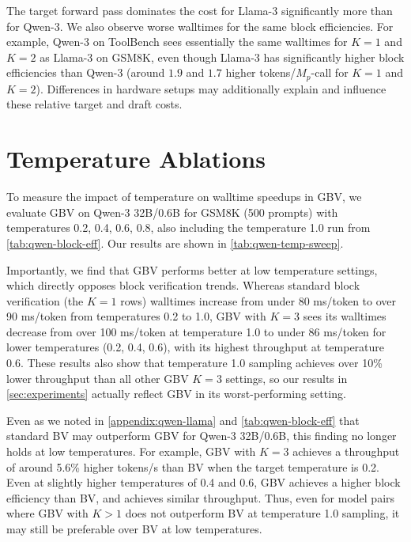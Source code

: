 \documentclass{article}
\theoremstyle{plain}
\theoremstyle{definition}
\theoremstyle{remark}
\begin{document}
The target forward pass dominates the cost for Llama-3 significantly more than for Qwen-3. We also observe worse walltimes for the same block efficiencies. For example, Qwen-3 on ToolBench sees essentially the same walltimes for $K=1$ and $K=2$ as Llama-3 on GSM8K, even though Llama-3 has significantly higher block efficiencies than Qwen-3 (around $1.9$ and $1.7$ higher tokens/$M_p$-call for $K=1$ and $K=2$). Differences in hardware setups may additionally explain and influence these relative target and draft costs.



\section{Temperature Ablations}
\label{appendix:temperature}

To measure the impact of temperature on walltime speedups in GBV, we evaluate GBV on Qwen-3 32B/0.6B for GSM8K (500 prompts) with temperatures 0.2, 0.4, 0.6, 0.8, also including the temperature 1.0 run from \cref{tab:qwen-block-eff}. Our results are shown in \cref{tab:qwen-temp-sweep}.

Importantly, we find that GBV performs better at low temperature settings, which directly opposes block verification trends. Whereas standard block verification (the $K=1$ rows) walltimes increase from under 80 ms/token to over 90 ms/token from temperatures 0.2 to 1.0, GBV with $K=3$ sees its walltimes decrease from over 100 ms/token at temperature 1.0 to under 86 ms/token for lower temperatures (0.2, 0.4, 0.6), with its highest throughput at temperature 0.6. These results also show that temperature 1.0 sampling achieves over 10\% lower throughput than all other GBV $K=3$ settings, so our results in \cref{sec:experiments} actually reflect GBV in its worst-performing setting.
 
Even as we noted in \cref{appendix:qwen-llama} and \cref{tab:qwen-block-eff} that standard BV may outperform GBV for Qwen-3 32B/0.6B, this finding no longer holds at low temperatures. For example, GBV with $K=3$ achieves a throughput of around 5.6\% higher tokens/s than BV when the target temperature is 0.2. Even at slightly higher temperatures of 0.4 and 0.6, GBV achieves a higher block efficiency than BV, and achieves similar throughput. Thus, even for model pairs where GBV with $K>1$ does not outperform BV at temperature 1.0 sampling, it may still be preferable over BV at low temperatures.
\end{document}
